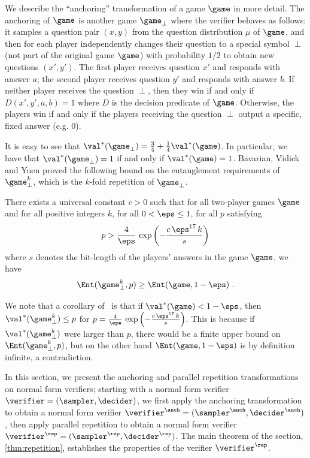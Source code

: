  We describe the ``anchoring'' transformation of a game $\game$ in more detail. The anchoring of $\game$ is another game $\game_\perp$ where the verifier behaves as follows: it samples a question pair $(x,y)$ from the question distribution $\mu$ of
$\game$, and then for each player independently changes their question to a special symbol $\perp$ (not part of the original game $\game$) with probability $1/2$ to
obtain new questions $(x',y')$. The first player receives question $x'$ and responds with answer $a$; the second player receives question $y'$ and responds with answer $b$. If neither player receives the question $\perp$, then they win if and only if $D(x',y',a,b) = 1$ where $D$ is the decision predicate of $\game$. Otherwise, the players win if and only if the players receiving the question $\perp$ output a specific, fixed answer (e.g. $0$). 

It is easy to see that $\val^*(\game_\perp) = \frac{3}{4} + \frac{1}{4} \val^*(\game)$. In particular, we have that $\val^*(\game_\perp) = 1$ if and only if $\val^*(\game) = 1$. Bavarian, Vidick and Yuen proved the following bound on the entanglement requirements of $\game_\perp^k$, which is the $k$-fold repetition of $\game_\perp$. 

\begin{theorem}
\label{thm:bvy}
There exists a universal constant $c > 0$ such that for all two-player games $\game$ and for all positive integers $k$, for all $0 < \eps \leq 1$, for all $p$ satisfying
\[
 p > \frac{4}{\eps}\, \exp \left ( - \frac{c \, \eps^{17} \, k}{s} \right)
\]
where $s$ denotes the bit-length of the players' answers in the game $\game$, we have
\[
	\Ent(\game_\perp^k,p) \geq \Ent(\game,1-\eps)~.
\]
\end{theorem}
We note that a corollary of~ is that if $\val^*(\game) < 1 - \eps$, then $\val^*(\game_\perp^k) \leq p$ for $p = \frac{4}{\eps}\, \exp \left ( - \frac{c \, \eps^{17} \, k}{s} \right)$. This is because if $\val^*(\game_\perp^k)$ were larger than $p$, there would be a finite upper bound on $\Ent(\game_\perp^k,p)$, but on the other hand $\Ent(\game,1-\eps)$ is by definition infinite, a contradiction. 

In this section, we present the anchoring and parallel repetition transformations on normal form verifiers; starting with a normal form verifier $\verifier = (\sampler,\decider)$, we first apply the anchoring transformation to obtain a normal form verifier $\vanch = (\sanch,\danch)$, then apply parallel repetition to obtain a normal form verifier $\verifier^\rep = (\sampler^\rep,\decider^\rep)$. The main theorem of the section, \cref{thm:repetition}, establishes the properties of the verifier $\verifier^\rep$.





